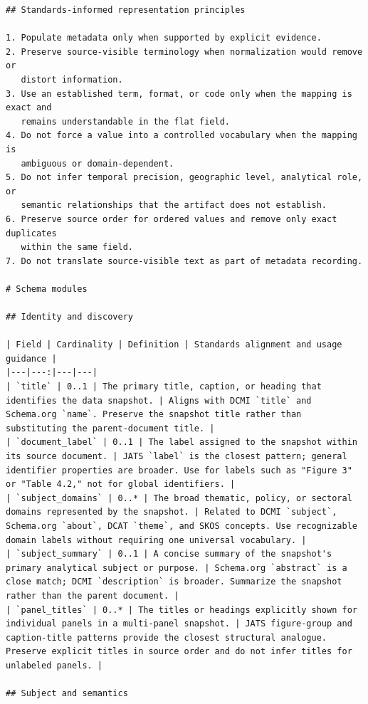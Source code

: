 \documentclass{article}
\begin{document}
\begin{lstlisting}
## Standards-informed representation principles

1. Populate metadata only when supported by explicit evidence.
2. Preserve source-visible terminology when normalization would remove or
   distort information.
3. Use an established term, format, or code only when the mapping is exact and
   remains understandable in the flat field.
4. Do not force a value into a controlled vocabulary when the mapping is
   ambiguous or domain-dependent.
5. Do not infer temporal precision, geographic level, analytical role, or
   semantic relationships that the artifact does not establish.
6. Preserve source order for ordered values and remove only exact duplicates
   within the same field.
7. Do not translate source-visible text as part of metadata recording.

# Schema modules

## Identity and discovery

| Field | Cardinality | Definition | Standards alignment and usage guidance |
|---|---:|---|---|
| `title` | 0..1 | The primary title, caption, or heading that identifies the data snapshot. | Aligns with DCMI `title` and Schema.org `name`. Preserve the snapshot title rather than substituting the parent-document title. |
| `document_label` | 0..1 | The label assigned to the snapshot within its source document. | JATS `label` is the closest pattern; general identifier properties are broader. Use for labels such as "Figure 3" or "Table 4.2," not for global identifiers. |
| `subject_domains` | 0..* | The broad thematic, policy, or sectoral domains represented by the snapshot. | Related to DCMI `subject`, Schema.org `about`, DCAT `theme`, and SKOS concepts. Use recognizable domain labels without requiring one universal vocabulary. |
| `subject_summary` | 0..1 | A concise summary of the snapshot's primary analytical subject or purpose. | Schema.org `abstract` is a close match; DCMI `description` is broader. Summarize the snapshot rather than the parent document. |
| `panel_titles` | 0..* | The titles or headings explicitly shown for individual panels in a multi-panel snapshot. | JATS figure-group and caption-title patterns provide the closest structural analogue. Preserve explicit titles in source order and do not infer titles for unlabeled panels. |

## Subject and semantics


\end{lstlisting}
\end{document}
